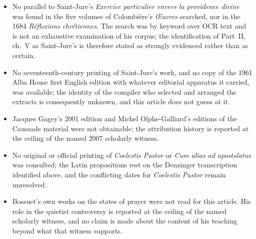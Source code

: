 \begin{itemize}[leftmargin=1.45em,itemsep=0.2em]
\item No parallel to Saint-Jure's \emph{Exercice particulier envers la providence divine} was found in the five volumes of Colombière's \emph{Œuvres} searched, nor in the 1684 \emph{Réflexions chrétiennes}. The search was by keyword over OCR text and is not an exhaustive examination of his corpus; the identification of Part~II, ch.~V as Saint-Jure's is therefore stated as strongly evidenced rather than as certain.
\item No seventeenth-century printing of Saint-Jure's work, and no copy of the 1961 Alba House first English edition with whatever editorial apparatus it carried, was available; the identity of the compiler who selected and arranged the extracts is consequently unknown, and this article does not guess at it.
\item Jacques Gagey's 2001 edition and Michel Olphe-Galliard's editions of the Caussade material were not obtainable; the attribution history is reported at the ceiling of the named 2007 scholarly witness.
\item No original or official printing of \emph{Coelestis Pastor} or \emph{Cum alias ad apostolatus} was consulted; the Latin propositions rest on the Denzinger transcription identified above, and the conflicting dates for \emph{Coelestis Pastor} remain unresolved.
\item Bossuet's own works on the states of prayer were not read for this article. His role in the quietist controversy is reported at the ceiling of the named scholarly witness, and no claim is made about the content of his teaching beyond what that witness supports.
\end{itemize}
